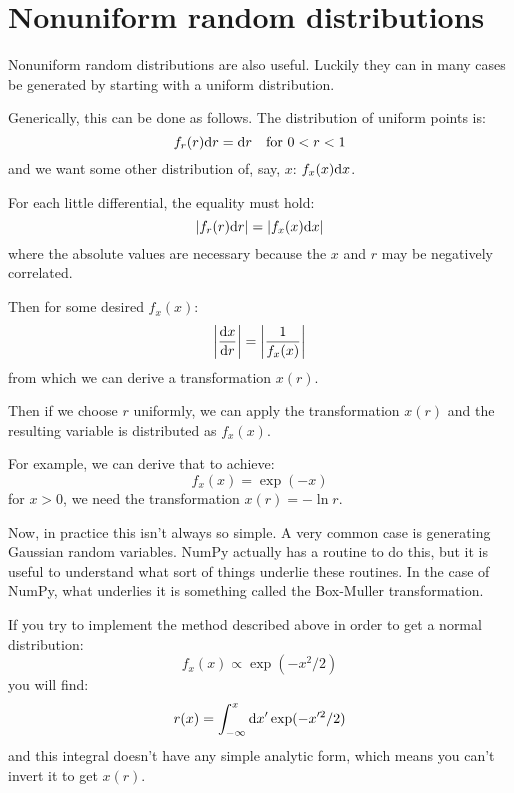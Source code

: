 \section{Nonuniform random distributions}

Nonuniform random distributions are also useful. Luckily they can in
many cases be generated by starting with a uniform distribution. 

Generically, this can be done as follows. The distribution of uniform
points is:
\begin{equation}
f_r(r) {\rm d}r = {\rm d}r \quad \mathrm{for~} 0 < r < 1
\end{equation}
and we want some other distribution of, say, $x$: $f_x(x) {\rm d}x$.

For each little differential, the equality must hold:
\begin{equation}
\left| f_r(r) {\rm d}r \right| = \left|f_x(x) {\rm d}x \right|
\end{equation}
where the absolute values are necessary because the $x$ and $r$ may be
negatively correlated.

Then for some desired $f_x(x)$:
\begin{equation}
\left| \frac{{\rm d}x}{{\rm d}r} \right| = \left|\frac{1}{f_x(x)}\right|
\end{equation}
from which we can derive a transformation $x(r)$.

Then if we choose $r$ uniformly, we can apply the transformation
$x(r)$ and the resulting variable is distributed as $f_x(x)$.

For example, we can derive that to achieve:
\begin{equation}
f_x(x) = \exp(-x)
\end{equation}
for $x>0$, we need the transformation $x(r) = -\ln r$.

Now, in practice this isn't always so simple. A very common case is
generating Gaussian random variables. NumPy actually has a routine to
do this, but it is useful to understand what sort of things underlie
these routines. In the case of NumPy, what underlies it is something
called the Box-Muller transformation.

If you try to implement the method described above in order to get a
normal distribution:
\begin{equation}
f_x(x) \propto \exp\left(-x^2/2\right)
\end{equation}
you will find:
\begin{equation}
r(x) = \int_{-\infty}^{x} {\rm d}x' \exp(-x'^2/2)
\end{equation}
and this integral doesn't have any simple analytic form, which means
you can't invert it to get $x(r)$. 

